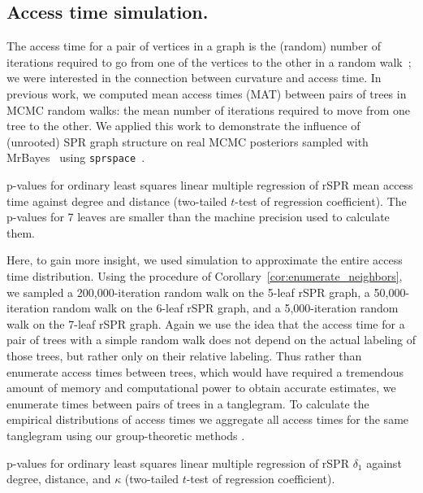 \documentclass[]{elsarticle}
\let\MYoriglatexcaption\caption
\renewcommand{\caption}[2][\relax]{\MYoriglatexcaption[#2]{#2}}
\begin{document}
\subsection{Access time simulation.}
The access time for a pair of vertices in a graph is the (random) number of iterations required to go from one of the vertices to the other in a random walk~\citep{lovasz1993random}; we were interested in the connection between curvature and access time.
In previous work, we computed mean access times (MAT) between pairs of trees in  MCMC random walks: the mean number of iterations required to move from one tree to the other.
We applied this work to demonstrate the influence of (unrooted) SPR graph structure on real MCMC posteriors sampled with MrBayes~\citep{Whidden2015-yi} using \texttt{sprspace}~\citep{sprspace}.

\begin{table}
\centering
\caption{p-values for ordinary least squares linear multiple regression of rSPR mean access time against degree and distance (two-tailed $t$-test of regression coefficient). The p-values for 7 leaves are smaller than the machine precision used to calculate them.}
\label{tab:regressionMAT}
\end{table}

Here, to gain more insight, we used simulation to approximate the entire access time distribution.
Using the procedure of Corollary~\ref{cor:enumerate_neighbors}, we sampled a 200,000-iteration random walk on the 5-leaf rSPR graph, a 50,000-iteration random walk on the 6-leaf rSPR graph, and a 5,000-iteration random walk on the 7-leaf rSPR graph.
Again we use the idea that the access time for a pair of trees with a simple random walk does not depend on the actual labeling of those trees, but rather only on their relative labeling.
Thus rather than enumerate access times between trees, which would have required a tremendous amount of memory and computational power to obtain accurate estimates, we enumerate times between pairs of trees in a tanglegram.
To calculate the empirical distributions of access times we aggregate all access times for the same tanglegram using our group-theoretic methods \citep{tangle}.

\begin{table}
\centering
\caption{p-values for ordinary least squares linear multiple regression of rSPR $\delta_1$ against degree, distance, and $\kappa$ (two-tailed $t$-test of regression coefficient).}
\label{tab:regressionDelta}
\vspace{2em}
\end{table}
\end{document}

